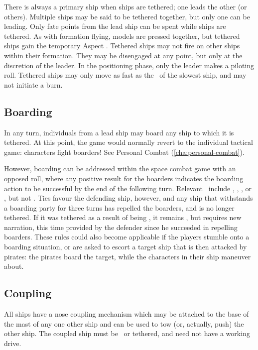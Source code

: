 There is always a primary ship when ships are tethered; one leads the other (or others). Multiple ships may be said to be tethered together, but only one can be leading. Only fate points from the lead ship can be spent while ships are tethered. As with formation flying, models are pressed together, but tethered ships gain the temporary Aspect . Tethered ships may not fire on other ships within their formation. They may be disengaged at any point, but only at the discretion of the leader. In the positioning phase, only the leader makes a piloting roll. Tethered ships may only move as fast as the \Vshift\ of the slowest ship, and may not initiate a burn.


\subsection{Boarding}
\label{sec:boarding}

In any turn, individuals from a lead ship may board any ship to which it is tethered. At this point, the game would normally revert to the individual tactical game: characters fight boarders! See Personal Combat (\autoref{cha:personal-combat}).

However, boarding can be addressed within the space combat game with an opposed roll, where any positive result for the boarders indicates the boarding action to be successful by the end of the following turn. Relevant \Aspects\ include , , , or , but not . Ties favour the defending ship, however, and any ship that withstands a boarding party for three turns has repelled the boarders, and is no longer tethered. If it was tethered as a result of being \TakenOut, it remains \TakenOut, but requires new narration, this time provided by the defender since he succeeded in repelling boarders. These rules could also become applicable if the players stumble onto a boarding situation, or are asked to escort a target ship that is then attacked by pirates: the pirates board the target, while the characters in their ship maneuver about.

\iflandscape{\vfil}{}
\subsection{Coupling}
\label{sec:coupling}

All ships have a nose coupling mechanism which may be attached to the base of the mast of any one other ship and can be used to tow (or, actually, push) the other ship. The coupled ship must be \TakenOut\ or tethered, and need not have a working drive.

